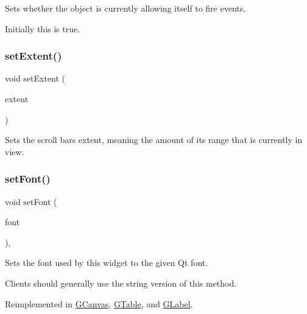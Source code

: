Sets whether the object is currently allowing itself to fire events. 

Initially this is true. \mbox{\label{classGScrollBar_a2b06f746a9b7b56cbb85154bbe3288c6}} 
\subsubsection{\texorpdfstring{set\+Extent()}{setExtent()}}
{\footnotesize\ttfamily void set\+Extent (\begin{DoxyParamCaption}\item[{int}]{extent }\end{DoxyParamCaption})\hspace{0.3cm}{\ttfamily [virtual]}}



Sets the scroll bar\textquotesingle{}s extent, meaning the amount of its range that is currently in view. 

\mbox{\label{classGInteractor_a2592348886ffea646c6534bf88f7c49d}} 
\subsubsection{\texorpdfstring{set\+Font()}{setFont()}\hspace{0.1cm}{\footnotesize\ttfamily [1/2]}}
{\footnotesize\ttfamily void set\+Font (\begin{DoxyParamCaption}\item[{const Q\+Font \&}]{font }\end{DoxyParamCaption})\hspace{0.3cm}{\ttfamily [virtual]}, {\ttfamily [inherited]}}



Sets the font used by this widget to the given Qt font. 

Clients should generally use the string version of this method. 

Reimplemented in \mbox{\hyperlink{classGCanvas_ad1d75b3840a41ba7d1e8a921696dc684}{G\+Canvas}}, \mbox{\hyperlink{classGTable_ad1d75b3840a41ba7d1e8a921696dc684}{G\+Table}}, and \mbox{\hyperlink{classGLabel_ad1d75b3840a41ba7d1e8a921696dc684}{G\+Label}}.

